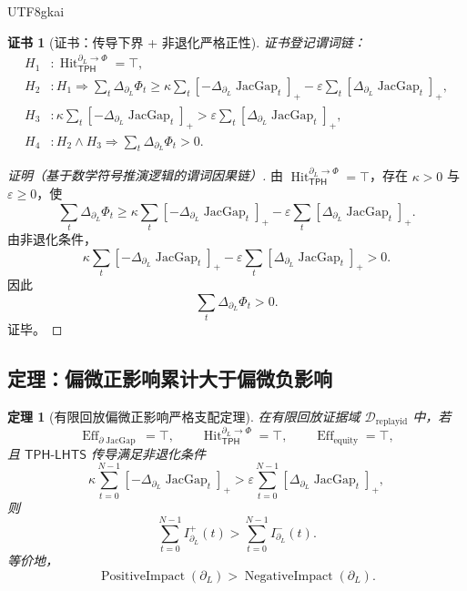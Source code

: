 \documentclass[12pt]{article}
\newtheorem{theorem}{定理}[section]
\newtheorem{Certificate}{证书}[section]
\newcommand{\TPH}{\ensuremath{\mathsf{TPH}}}
\newcommand{\TPHLHTS}{\ensuremath{\mathsf{TPH\mbox{-}LHTS}}}
\DeclareMathOperator{\Eff}{Eff}
\DeclareMathOperator{\Hit}{Hit}
\DeclareMathOperator{\JacGap}{JacGap}
\DeclareMathOperator{\PositiveImpact}{PositiveImpact}
\DeclareMathOperator{\NegativeImpact}{NegativeImpact}
\begin{document}
\begin{CJK*}{UTF8}{gkai}
\begin{Certificate}[证书：传导下界 + 非退化严格正性]
\label{cert:tex58-bridge-positive-attribution}
证书登记谓词链：
\[
\begin{aligned}
  H_1 &: \Hit_{\TPH}^{\partial_L\to\Phi}=\top,\\
  H_2 &: H_1\Rightarrow
  \sum_t\Delta_{\partial_L}\Phi_t
  \ge
  \kappa\sum_t[-\Delta_{\partial_L}\JacGap_t]_+
  -
  \varepsilon\sum_t[\Delta_{\partial_L}\JacGap_t]_+,\\
  H_3 &: \kappa\sum_t[-\Delta_{\partial_L}\JacGap_t]_+
  >
  \varepsilon\sum_t[\Delta_{\partial_L}\JacGap_t]_+,\\
  H_4 &: H_2\wedge H_3
  \Rightarrow
  \sum_t\Delta_{\partial_L}\Phi_t>0.
\end{aligned}
\]
\end{Certificate}

\begin{proof}[证明（基于数学符号推演逻辑的谓词因果链）]
由 \(\Hit_{\TPH}^{\partial_L\to\Phi}=\top\)，存在 \(\kappa>0\) 与 \(\varepsilon\ge0\)，使
\[
  \sum_t\Delta_{\partial_L}\Phi_t
  \ge
  \kappa\sum_t[-\Delta_{\partial_L}\JacGap_t]_+
  -
  \varepsilon\sum_t[\Delta_{\partial_L}\JacGap_t]_+.
\]
由非退化条件，
\[
  \kappa\sum_t[-\Delta_{\partial_L}\JacGap_t]_+
  -
  \varepsilon\sum_t[\Delta_{\partial_L}\JacGap_t]_+
  >
  0.
\]
因此
\[
  \sum_t\Delta_{\partial_L}\Phi_t>0.
\]
证毕。
\end{proof}

\subsection{定理：偏微正影响累计大于偏微负影响}
\label{subsec:tex58-main-impact-theorem}

\begin{theorem}[有限回放偏微正影响严格支配定理]
\label{thm:tex58-positive-impact-dominates}
在有限回放证据域 \(\mathcal D_{\mathrm{replayid}}\) 中，若
\[
  \Eff_{\partial\JacGap}=\top,
  \qquad
  \Hit_{\TPH}^{\partial_L\to\Phi}=\top,
  \qquad
  \Eff_{\mathrm{equity}}=\top,
\]
且 \(\TPHLHTS{}\) 传导满足非退化条件
\[
  \kappa
  \sum_{t=0}^{N-1}[-\Delta_{\partial_L}\JacGap_t]_+
  >
  \varepsilon
  \sum_{t=0}^{N-1}[\Delta_{\partial_L}\JacGap_t]_+,
\]
则
\[
  \sum_{t=0}^{N-1}I^+_{\partial_L}(t)
  >
  \sum_{t=0}^{N-1}I^-_{\partial_L}(t).
\]
等价地，
\[
  \PositiveImpact(\partial_L)
  >
  \NegativeImpact(\partial_L).
\]
\end{theorem}


\end{CJK*}
\end{document}
